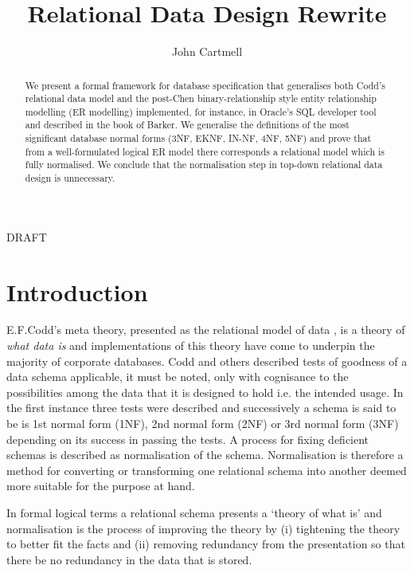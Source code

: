 \documentclass[10pt,a4paper]{article}
\begin{document}
\title{Relational Data Design Rewrite}


\author{John Cartmell}

\maketitle
\begin{center}
DRAFT
\end{center}

\begin{abstract}
\noindent 
We present a formal framework for database specification that generalises  both Codd's relational data model and the post-Chen binary-relationship style entity relationship modelling (ER modelling) implemented, for instance, in Oracle's SQL developer tool and  described in the book of Barker.  We generalise the definitions of the most significant database normal forms (3NF, EKNF, IN-NF, 4NF, 5NF) and prove that from a well-formulated logical ER model there corresponds a relational model which is fully normalised. We conclude that the normalisation step in top-down relational data design is unnecessary.  
\end{abstract}

% 
\section{Introduction}


E.F.Codd's meta theory, presented as the relational model of data \cite{Codd1970},
 is a theory of \textit{what data is} and implementations of this theory have come to underpin 
the majority of corporate databases.   Codd and others described tests of goodness of a data schema applicable, it must be noted, only with cognisance to the possibilities among the data that it is designed to hold i.e. the intended usage.
In the first instance three tests were described and successively a schema is said to be is 1st normal form (1NF), 2nd normal form (2NF) or 3rd normal form (3NF) depending on its success in passing the tests. A process for fixing deficient schemas is described as normalisation of the schema. 
Normalisation is therefore a method for converting or transforming one relational schema into another deemed more suitable for the purpose at hand. 

In formal logical terms a relational schema presents a `theory of what is' and normalisation is the process of improving the theory by (i) tightening the theory to better fit the facts and (ii) removing redundancy from the presentation so that there be no redundancy in the data that is stored.
\end{document}
